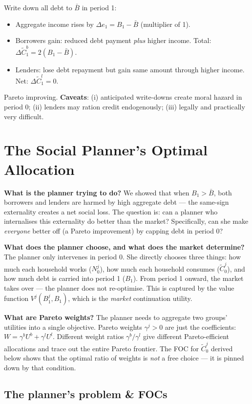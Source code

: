 \documentclass[11pt,a4paper]{article}
\begin{document}
Write down all debt to $\bar{B}$ in period 1:
\begin{itemize}
    \item Aggregate income rises by $\Delta e_1 = B_1 - \bar{B}$ (multiplier of 1).
    \item Borrowers gain: reduced debt payment \textit{plus} higher income. Total: $\Delta\tilde{C}_1^b = 2(B_1-\bar{B})$.
    \item Lenders: lose debt repayment but gain same amount through higher income. Net: $\Delta\tilde{C}_1^l = 0$.
\end{itemize}
Pareto improving. \textbf{Caveats}: (i) anticipated write-downs create moral hazard in period 0; (ii) lenders may ration credit endogenously; (iii) legally and practically very difficult.

\section{The Social Planner's Optimal Allocation}\label{sec:planner}

\textbf{What is the planner trying to do?} We showed that when $B_1 > \bar{B}$, both borrowers and lenders are harmed by high aggregate debt --- the same-sign externality creates a net social loss. The question is: can a planner who internalises this externality do better than the market? Specifically, can she make \textit{everyone} better off (a Pareto improvement) by capping debt in period 0?

\textbf{What does the planner choose, and what does the market determine?} The planner only intervenes in period 0. She directly chooses three things: how much each household works ($N_0^j$), how much each household consumes ($\tilde{C}_0^j$), and how much debt is carried into period 1 ($B_1$). From period 1 onward, the market takes over --- the planner does not re-optimise. This is captured by the value function $V^j(B_1^j, B_1)$, which is the \textit{market} continuation utility.

\textbf{What are Pareto weights?} The planner needs to aggregate two groups' utilities into a single objective. Pareto weights $\gamma^j > 0$ are just the coefficients: $W = \gamma^b U^b + \gamma^l U^l$. Different weight ratios $\gamma^b/\gamma^l$ give different Pareto-efficient allocations and trace out the entire Pareto frontier. The FOC for $\tilde{C}_0^j$ derived below shows that the optimal ratio of weights is \textit{not} a free choice --- it is pinned down by that condition.

\subsection{The planner's problem \& FOCs}
\end{document}
